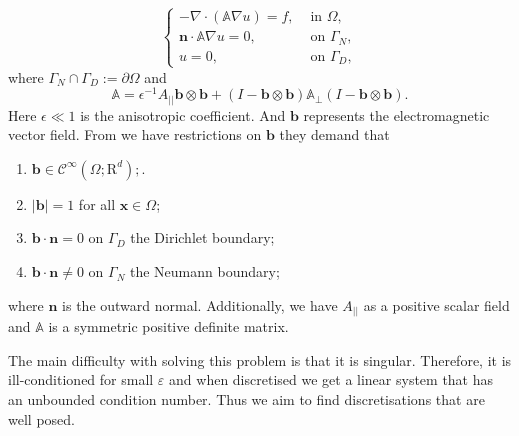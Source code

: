 \documentclass[12pt]{ociamthesis}
\begin{document}
\begin{equation} \label{PDE}
\begin{cases}
-\nabla \cdot (\mathbb{A}\nabla u) = f, & \text{ in }\Omega,\\
\mathbf{n}\cdot \mathbb{A}\nabla u = 0, & \text{ on }\Gamma_N, \\
u = 0, & \text{  on }\Gamma_D,
\end{cases}
\end{equation}
where $\Gamma_N \cap \Gamma_D := \partial \Omega$ and
\begin{equation} \label{Mat_A}
\mathbb{A} = \epsilon^{-1} A_{||}\mathbf{b}\otimes \mathbf{b}
+(I - \mathbf{b}\otimes \mathbf{b})\mathbb{A}_{\perp}
(I - \mathbf{b}\otimes \mathbf{b}).
\end{equation}
    Here $\epsilon \ll 1$ is the anisotropic coefficient. And $\mathbf{b}$ represents the electromagnetic vector field. From \cite{DN} we have restrictions on $\mathbf{b}$ they demand that
    \begin{enumerate}
  \item $\mathbf{b} \in \mathcal{C}^{\infty}(\Omega; \mathrm{R}^d);$.
  \item $|\mathbf{b}|=1$ for all $\mathbf{x} \in \Omega$;
  \item $\mathbf{b}\cdot \mathbf{n} = 0$ on $\Gamma_D$ the Dirichlet boundary;
  \item $\mathbf{b}\cdot \mathbf{n} \neq 0$ on $\Gamma_N$ the Neumann boundary;
\end{enumerate}
where $\mathbf{n}$ is the outward normal. Additionally, we have  $A_{||}$ as a positive scalar field and $\mathbb{A}$ is a symmetric positive definite matrix.

The main difficulty with solving this problem is that it is singular. Therefore, it is ill-conditioned for small $\varepsilon$ and when discretised we get a linear system that has an unbounded condition number. Thus we aim to find discretisations that are well posed.  
\end{document}
